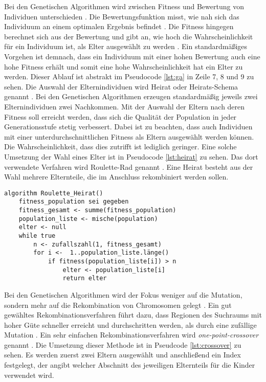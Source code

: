 Bei den Genetischen Algorithmen wird zwischen Fitness und Bewertung von Individuen unterschieden \cite[S. 196]{schoeneburg}. Die Bewertungsfunktion misst, wie nah sich das Individuum an einem optimalen Ergebnis befindet \cite[S. 196]{schoeneburg}.
Die Fitness hingegen berechnet sich aus der Bewertung und gibt an, wie hoch die Wahrscheinlichkeit für ein Individuum ist, als Elter ausgewählt zu werden \cite[S. 196]{schoeneburg}. Ein standardmäßiges Vorgehen ist demnach, dass ein Individuum mit einer hohen Bewertung auch eine hohe Fitness erhält und somit eine hohe Wahrscheinlichkeit hat ein Elter zu werden.
Dieser Ablauf ist abstrakt im Pseudocode \ref{lst:ga} in Zeile 7, 8 und 9 zu sehen.
Die Auswahl der Elternindividuen wird Heirat oder Heirats-Schema genannt \cite[S. 204]{schoeneburg}. Bei den Genetischen Algorithmen erzeugen standardmäßig jeweils zwei Elternindividuen zwei Nachkommen. 
Mit der Auswahl der Eltern nach deren Fitness soll erreicht werden, dass sich die Qualität der Population in jeder Generationsstufe stetig verbessert.
Dabei ist zu beachten, dass auch Individuen mit einer unterdurchschnittlichen Fitness als Eltern ausgewählt werden können. Die Wahrscheinlichkeit, dass dies zutrifft ist lediglich geringer.
Eine solche Umsetzung der Wahl eines Elter ist in Pseudocode \ref{lst:heirat} zu sehen. Das dort verwendete Verfahren wird Roulette-Rad genannt \cite[S. 204]{schoeneburg}. Eine Heirat besteht aus der Wahl mehrere Elternteile, die im Anschluss rekombiniert werden sollen.
\begin{lstlisting}[caption={Roulette-Rad}, firstnumber=1, captionpos=b,label=lst:heirat]
algorithm Roulette_Heirat()
	fitness_population sei gegeben
	fitness_gesamt <- summe(fitness_population)
	population_liste <- mische(population)
	elter <- null
	while true
		n <- zufallszahl(1, fitness_gesamt)
		for i <-  1..population_liste.länge()
			if fitness(population_liste[i]) > n
				elter <- population_liste[i]
				return elter
\end{lstlisting}
Bei den Genetischen Algorithmen wird der Fokus weniger auf die Mutation, sondern mehr auf die Rekombination von Chromosomen gelegt \cite[S. 198]{schoeneburg}. Ein gut gewähltes Rekombinationsverfahren führt dazu, dass Regionen des Suchraums mit hoher Güte schneller erreicht und durchschritten werden, als durch eine zufällige Mutation \cite[S. 198]{schoeneburg}.
Ein sehr einfachen Rekombinationsverfahren wird \textit{one-point-crossover} genannt \cite[S. 198]{schoeneburg}. Die Umsetzung dieser Methode ist in Pseudcode \ref{lst:crossover} zu sehen. Es werden zuerst zwei Eltern ausgewählt  und anschließend ein Index festgelegt, der angibt welcher Abschnitt des jeweiligen Elternteils für die Kinder verwendet wird.
